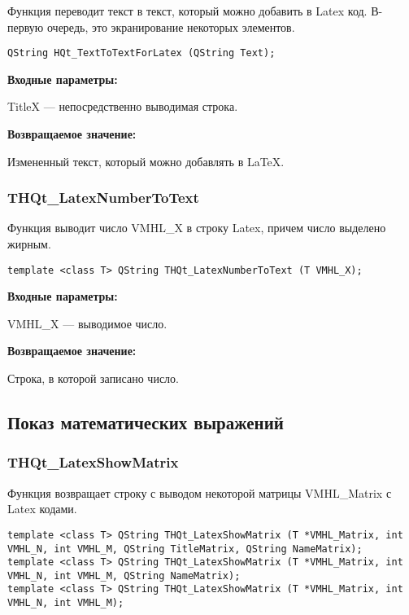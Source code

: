 \documentclass[a4paper,12pt]{article}
\begin{document}
Функция переводит текст в текст, который можно добавить в Latex код. В-первую очередь, это экранирование некоторых элементов.


\begin{lstlisting}[label=code_syntax_HQt_TextToTextForLatex,caption=Синтаксис]
QString HQt_TextToTextForLatex (QString Text);
\end{lstlisting}

\textbf{Входные параметры:}

TitleX --- непосредственно выводимая строка.

\textbf{Возвращаемое значение:}

Измененный текст, который можно добавлять в LaTeX.


\subsubsection{THQt\_LatexNumberToText}\label{THQt_LatexNumberToText}

Функция выводит число VMHL\_X в строку Latex, причем число выделено жирным.


\begin{lstlisting}[label=code_syntax_THQt_LatexNumberToText,caption=Синтаксис]
template <class T> QString THQt_LatexNumberToText (T VMHL_X);
\end{lstlisting}

\textbf{Входные параметры:}

VMHL\_X --- выводимое число.

\textbf{Возвращаемое значение:}

Строка, в которой записано число.


\subsection{Показ математических выражений}

\subsubsection{THQt\_LatexShowMatrix}\label{THQt_LatexShowMatrix}

Функция возвращает строку с выводом некоторой матрицы VMHL\_Matrix с Latex кодами.


\begin{lstlisting}[label=code_syntax_THQt_LatexShowMatrix,caption=Синтаксис]
template <class T> QString THQt_LatexShowMatrix (T *VMHL_Matrix, int VMHL_N, int VMHL_M, QString TitleMatrix, QString NameMatrix);
template <class T> QString THQt_LatexShowMatrix (T *VMHL_Matrix, int VMHL_N, int VMHL_M, QString NameMatrix);
template <class T> QString THQt_LatexShowMatrix (T *VMHL_Matrix, int VMHL_N, int VMHL_M);
\end{lstlisting}
\end{document}
